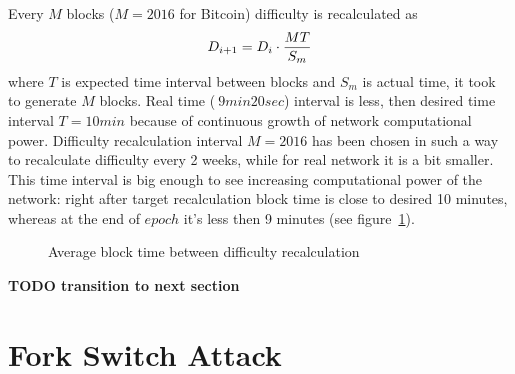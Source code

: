 \documentclass[number,preprint,review]{elsarticle}
\begin{document}
Every \(M\) blocks (\(M=2016\) for Bitcoin) difficulty is recalculated as
\begin{equation}
D_{i+1}=D_i\cdot {MT\over S_m}
\end{equation}
where \(T\) is expected time interval between blocks and \(S_m\) is actual time, it took to generate \(M\) blocks.
Real time (\(~ 9 min 20 sec\)) interval is less, then desired time interval \(T=10 min\) because of continuous growth of network computational power.
Difficulty recalculation interval \(M=2016\) has been chosen in such a way to recalculate difficulty every 2 weeks, while for real network it is a bit smaller.
This time interval is big enough to see increasing computational power of the network: right after target recalculation block time is close to desired 10 minutes, whereas at the end of \(epoch\) it's less then 9 minutes (see figure~\ref{fig:image}).
\begin{figure}[h]
\caption{Average block time between difficulty recalculation}
\label{fig:image}
\end{figure}

\textbf{TODO transition to next section}

\section{Fork Switch Attack}
\label{sec:attack}
\end{document}
